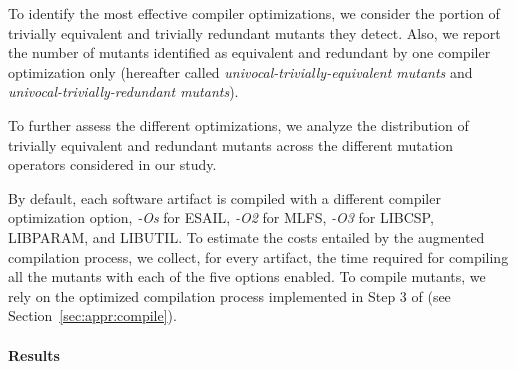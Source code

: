 To identify the most effective compiler optimizations, we consider the portion of trivially equivalent and trivially redundant mutants they detect. Also, we report the number of mutants identified as equivalent and redundant  by one compiler optimization only (hereafter called \emph{univocal-trivially-equivalent mutants} and \emph{univocal-trivially-redundant mutants}). 

{To further assess the different optimizations, we analyze the distribution of trivially equivalent and redundant mutants across the different mutation operators considered in our study.}

{By default, each software artifact is compiled with a different compiler optimization option, \emph{-Os} for ESAIL, \emph{-O2} for MLFS, \emph{-O3} for LIBCSP, LIBPARAM, and LIBUTIL.}
To estimate the costs entailed by the augmented compilation process, we collect, for every artifact, the time required for compiling all the mutants with each of the five options enabled. To compile mutants, we rely on the optimized compilation process implemented in Step 3 of \APPR (see Section~\ref{sec:appr:compile}).

\paragraph{Results}



